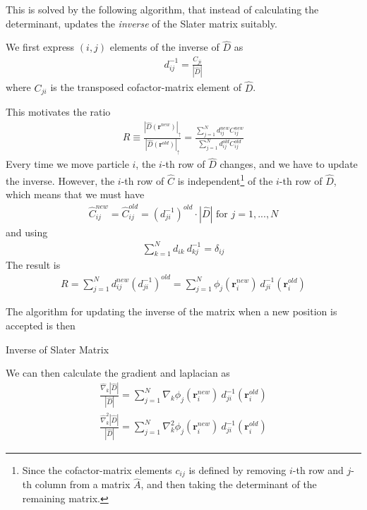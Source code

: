 \documentclass[twocolumns, a4paper,10pt,fleqn]{extarticle}
\newcommand{\eq}[1]{{\small\begin{align*}#1\end{align*}}}
\renewcommand\vec[1]{\boldsymbol{\mathbf{#1}}}
\newcommand{\op}[1]{\hat{#1}}
\begin{document}
This is solved by the following algorithm, that instead of calculating 
the determinant, updates the \textit{inverse} of the Slater matrix suitably.

We first express $(i,j)$ elements of the inverse of $\op D$ as
\eq{
  d_{ij}^{-1} = \frac{C_{ji}}{|\op D|}
}
where $C_{ji}$ is the transposed cofactor-matrix element of $\op D$.

This motivates the ratio
\eq{
  R \equiv \frac{|\op D(\vec r^{new})|_{\uparrow}}{|\op D(\vec r^{old})|_{\uparrow}} 
  = \frac{\sum_{j=1}^N d_{ij}^{new} C_{ij}^{new}}
    {\sum_{j=1}^N d_{ij}^{old} C_{ij}^{old}}
}
Every time we move particle $i$, the $i$-th row of $\op D$ changes,
and we have to update the inverse. However, the $i$-th row of $\op C$
is independent\footnote{Since the cofactor-matrix elements $c_{ij}$ is defined by 
removing $i$-th row and $j$-th column from a matrix $\op A$,
and then taking the determinant of the remaining matrix.} 
of the $i$-th row of $\op D$, which means that
we must have
\eq{
  \op C_{ij}^{new} = \op C_{ij}^{old} = (d_{ji}^{-1})^{old}\cdot |\op D| 
    \text{ for } j=1,...,N
}
and using
\eq{
  \sum_{k=1}^N d_{ik}\ d_{kj}^{-1} =\delta_{ij}
}
The result is
\eq{
  R=\sum_{j=1}^N d_{ij}^{new} (d_{ji}^{-1})^{old}
    =\sum_{j=1}^N \phi_j(\vec r_i^{new})\ d_{ji}^{-1} (\vec r_i^{old})
}

The algorithm for updating the inverse of the matrix 
when a new position is accepted is then

\begin{algorithm}
	\caption{Inverse of Slater Matrix}\label{algo1}
  \begin{algorithmic}[1]
      \State{$ S_j = \sum_{l=1}^N d_{il}(\vec r^{new}) d_{lj}^{-1}(\vec r^{old}) $}
    \EndFor
    \EndProcedure
    \EndProcedure
  \end{algorithmic}
\end{algorithm}

We can then calculate the gradient and laplacian as
\eq{
  \frac{\op\nabla_k |\op D|}{|\op D|} 
    = \sum_{j=1}^N \nabla_k \phi_j(\vec r_i^{new})\ d_{ji}^{-1} (\vec r_i^{old})\\
  \frac{\op\nabla_k^2 |\op D|}{|\op D|} 
    = \sum_{j=1}^N \nabla_k^2 \phi_j(\vec r_i^{new})\ d_{ji}^{-1} (\vec r_i^{old})
}
\end{document}

